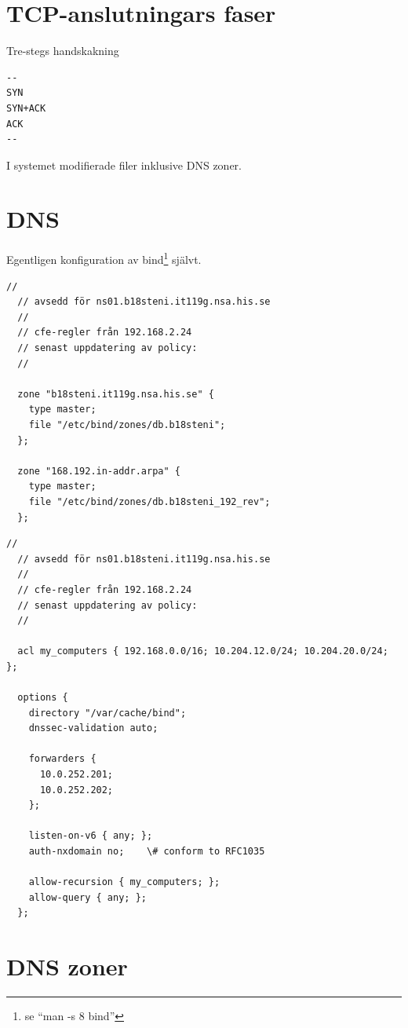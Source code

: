 \documentclass[swedish,10pt,a4paper]{article}
\begin{document}
\section{TCP-anslutningars faser}\label{sec:tcp_phases}

Tre-stegs handskakning
\begin{verbatim}
--
SYN
SYN+ACK
ACK
--
\end{verbatim}

\appendix

I systemet modifierade filer inklusive DNS zoner.

\section{DNS}\label{sec:appendix_bind_config}

Egentligen konfiguration av bind\footnote{se ``man -s 8 bind''} självt.

\begin{lstlisting}[caption={/etc/bind/named.conf.local}]
  //
  // avsedd för ns01.b18steni.it119g.nsa.his.se
  //
  // cfe-regler från 192.168.2.24
  // senast uppdatering av policy:
  //

  zone "b18steni.it119g.nsa.his.se" {
    type master;
    file "/etc/bind/zones/db.b18steni";
  };

  zone "168.192.in-addr.arpa" {
    type master;
    file "/etc/bind/zones/db.b18steni_192_rev";
  };
\end{lstlisting}

\begin{lstlisting}[caption={/etc/bind/named.conf.options}]
  //
  // avsedd för ns01.b18steni.it119g.nsa.his.se
  //
  // cfe-regler från 192.168.2.24
  // senast uppdatering av policy:
  //

  acl my_computers { 192.168.0.0/16; 10.204.12.0/24; 10.204.20.0/24; };

  options {
    directory "/var/cache/bind";
    dnssec-validation auto;

    forwarders {
      10.0.252.201;
      10.0.252.202;
    };

    listen-on-v6 { any; };
    auth-nxdomain no;    \# conform to RFC1035

    allow-recursion { my_computers; };
    allow-query { any; };
  };
\end{lstlisting}

\section{DNS zoner}\label{sec:appendix_dns_zones}
\end{document}
